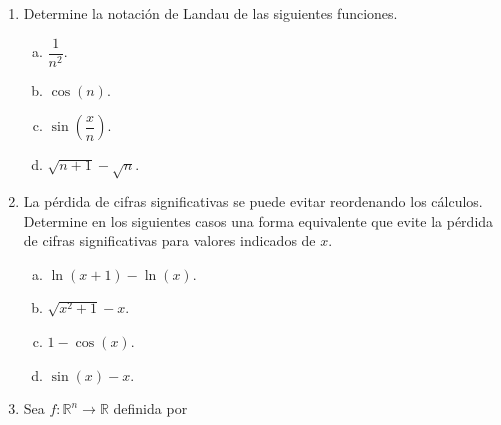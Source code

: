 \documentclass[
	spanish,
	9pt,
	utf8,
	xcolor=table,
	handout,
	aspectratio=1610,
	professionalfonts,
	notheorems,
	mathserif,
]{beamer}
\begin{document}
\begin{frame}

	\begin{enumerate}
		\item
		      Determine la notación de Landau de las siguientes funciones.

		      \begin{multicols}{4}
			      \begin{enumerate}[a)]
				      \item

				            $\dfrac{1}{n^{2}}$.

				      \item

				            $\cos\left(n\right)$.

				      \item

				            $\sin\left(\dfrac{x}{n}\right)$.

				      \item

				            $\sqrt{n+1}-\sqrt{n}$.
			      \end{enumerate}
		      \end{multicols}

		\item
		      La pérdida de cifras significativas se puede evitar reordenando los cálculos.
		      Determine en los siguientes casos una forma equivalente que evite la pérdida de cifras significativas para valores indicados de $x$.

		      \begin{multicols}{4}
			      \begin{enumerate}[a)]
				      \item

				            $\ln\left(x+1\right)-\ln\left(x\right)$.

				      \item

				            $\sqrt{x^{2}+1}-x$.

				      \item
				            $1-\cos\left(x\right)$.

				      \item

				            $\sin\left(x\right)-x$.
			      \end{enumerate}
		      \end{multicols}

		\item
		      Sea $f\colon\mathbb{R}^{n}\to\mathbb{R}$ definida por


\end{enumerate}
\end{frame}
\end{document}
